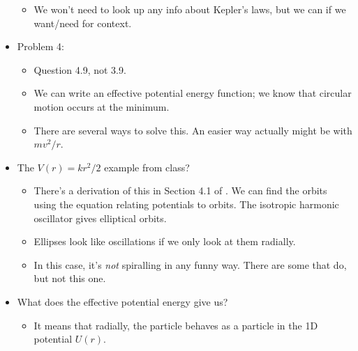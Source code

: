 \documentclass[../notes.tex]{subfiles}
\begin{document}
\begin{itemize}
\begin{itemize}
        \item We won't need to look up any info about Kepler's laws, but we can if we want/need for context.
    \end{itemize}
    \item Problem 4:
    \begin{itemize}
        \item Question 4.9, not 3.9.
        \item We can write an effective potential energy function; we know that circular motion occurs at the minimum.
        \item There are several ways to solve this. An easier way actually might be with $mv^2/r$.
    \end{itemize}
    \item The $V(r)=kr^2/2$ example from class?
    \begin{itemize}
        \item There's a derivation of this in Section 4.1 of \textcite{bib:KibbleBerkshire}. We can find the orbits using the equation relating potentials to orbits. The isotropic harmonic oscillator gives elliptical orbits.
        \item Ellipses look like oscillations if we only look at them radially.
        \item In this case, it's \emph{not} spiralling in any funny way. There are some that do, but not this one.
    \end{itemize}
    \item What does the effective potential energy give us?
    \begin{itemize}
        \item It means that radially, the particle behaves as a particle in the 1D potential $U(r)$.
    \end{itemize}
\end{itemize}
\end{document}
